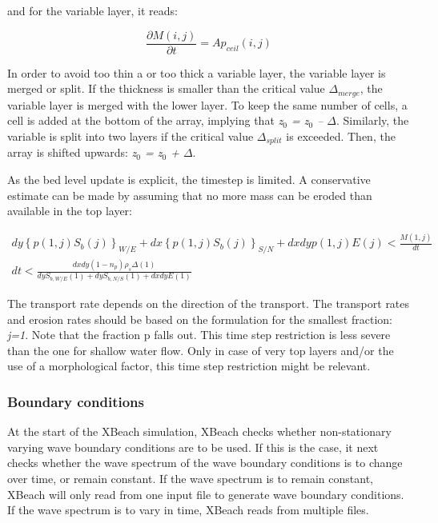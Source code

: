 \documentclass{article}
\begin{document}
\noindent and for the variable layer, it reads:

\noindent 
\begin{equation} \label{6.23)} 
\frac{\partial M(i,j)}{\partial t} =Ap_{ceil} (i,j) 
\end{equation} 
 

\noindent In order to avoid too thin a or too thick a variable layer, the variable layer is merged or split. If the thickness is smaller than the critical value \textit{$\Delta $${}_{merge}$}, the variable layer is merged with the lower layer. To keep the same number of cells, a cell is added at the bottom of the array, implying that \textit{z${}_{0}$ = z${}_{0}$ -- $\Delta $}. Similarly, the variable is split into two layers if the critical value $\Delta $${}_{split}$ is exceeded. Then, the array is shifted upwards: \textit{z${}_{0}$ = z${}_{0}$ + $\Delta $}. 

\noindent 

\noindent As the bed level update is explicit, the timestep is limited. A conservative estimate can be made by assuming that no more mass can be eroded than available in the top layer:

\noindent 
\begin{equation} \label{6.24)} 
\begin{array}{l} {dy\left\{p(1,j)S_{b} (j)\right\}_{W/E} +dx\left\{p(1,j)S_{b} (j)\right\}_{S/N} +dxdyp(1,j)E(j)<\frac{M(1,j)}{dt} } \\ {dt<\frac{dxdy\left(1-n_{p} \right)\rho _{s} \Delta (1)}{dyS_{b,W/E} (1)+dyS_{b,N/S} (1)+dxdyE(1)} } \end{array} 
\end{equation} 
 

\noindent The transport rate depends on the direction of the transport. The transport rates and erosion rates should be based on the formulation for the smallest fraction: \textit{j=1}. Note that the fraction p falls out. This time step restriction is less severe than the one for shallow water flow. Only in case of very top layers and/or the use of a morphological factor, this time step restriction might be relevant.\eject 


\subsubsection{ Boundary conditions}

\noindent At the start of the XBeach simulation, XBeach checks whether non-stationary varying wave boundary conditions are to be used. If this is the case, it next checks whether the wave spectrum of the wave boundary conditions is to change over time, or remain constant. If the wave spectrum is to remain constant, XBeach will only read from one input file to generate wave boundary conditions. If the wave spectrum is to vary in time, XBeach reads from multiple files. 
\end{document}
